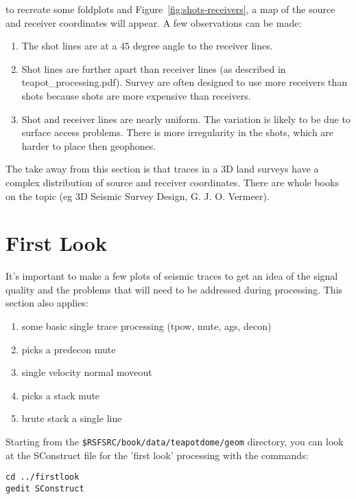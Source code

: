 to recreate some foldplots and Figure~\ref{fig:shots-receivers}, a map of the source and receiver coordinates will appear.  A few observations can be made:
\begin{enumerate}
\item The shot lines are at a 45 degree angle to the receiver lines.  
\item Shot lines are further apart than receiver lines (as described in teapot\_processing.pdf).  Survey are often designed to use more receivers than shots because shots are more expensive than receivers.
\item Shot and receiver lines are nearly uniform.  The variation is likely to be due to surface access problems.  There is more irregularity in the shots, which are harder to place then geophones.
\end{enumerate}

The take away from this section is that traces in a 3D land surveys have a complex distribution of source and receiver coordinates.  There are whole books on the topic (eg 3D Seismic Survey Design, G. J. O. Vermeer).





\section{First Look}
It's important to make a few plots of seismic traces to get an idea of the signal quality and the problems that will need to be addressed during processing.   This section also applies:
\begin{enumerate} 
\item some basic single trace processing (tpow, mute, ags, decon)
\item picks a predecon mute
\item single velocity normal moveout
\item picks a stack mute
\item brute stack a single line
\end{enumerate}

Starting from the \texttt{\$RSFSRC/book/data/teapotdome/geom} directory, you can look at the SConstruct file for the 'first look' processing with the commands:
\begin{verbatim}
cd ../firstlook
gedit SConstruct
\end{verbatim}

